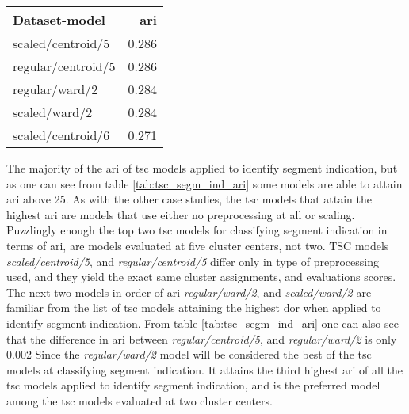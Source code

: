\begin{table*}
    \centering
    \begin{tabular}{lr}
        \toprule
        Dataset-model     &  \acrshort{ari} \\
        \midrule
        scaled/centroid/5  & 0.286 \\
        regular/centroid/5 & 0.286 \\
        regular/ward/2     & 0.284 \\
        scaled/ward/2      & 0.284 \\
        scaled/centroid/6  & 0.271 \\
        \bottomrule
    \end{tabular}
    \caption{The five highest \acrshort{ari} scores attained when applying \acrshort{tsc} for detecting segmend indication.
             The \textbf{Dataset-model} column indicates \textit{Type of preprocessing used}$/$\textit{Linkage criteria of model}$/$\textit{Number of cluster centers}.}
    \label{tab:tsc_segm_ind_ari}
\end{table*}

The majority of the \acrshort{ari} of \acrshort{tsc} models applied to identify segment indication, but as one can see from table \ref{tab:tsc_segm_ind_ari} some models are able to attain \acrshort{ari} above 25. As with the other case studies, the \acrshort{tsc} models that attain the highest \acrshort{ari} are models that use either no preprocessing at all or scaling. Puzzlingly enough the top two \acrshort{tsc} models for classifying segment indication in terms of \acrshort{ari}, are models evaluated at five cluster centers, not two. TSC models \textit{scaled/centroid/5}, and \textit{regular/centroid/5} differ only in type of preprocessing used, and they yield the exact same cluster assignments, and evaluations scores. The next two models in order of \acrshort{ari} \textit{regular/ward/2}, and \textit{scaled/ward/2} are familiar from the list of \acrshort{tsc} models attaining the highest \acrshort{dor} when applied to identify segment indication. From table \ref{tab:tsc_segm_ind_ari} one can also see that the difference in \acrshort{ari} between \textit{regular/centroid/5}, and \textit{regular/ward/2} is only 0.002 Since the \textit{regular/ward/2} model will be considered the best of the \acrshort{tsc} models at classifying segment indication. It attains the third highest \acrshort{ari} of all the \acrshort{tsc} models applied to identify segment indication, and is the preferred model among the \acrshort{tsc} models evaluated at two cluster centers.

